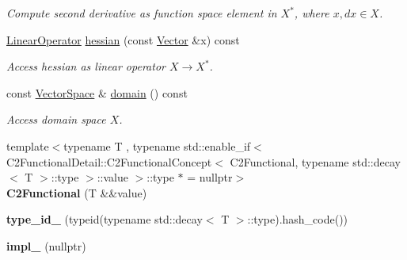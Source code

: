 \begin{DoxyCompactItemize}
\begin{DoxyCompactList}\small\item\em \-Compute second derivative as function space element in $X^*$, where $x,dx\in X$. \end{DoxyCompactList}\item 
\hypertarget{classSpacy_1_1C2Functional_a97eeeb376ed178ea7e2f109967f99c24}{\hyperlink{classSpacy_1_1LinearOperator}{\-Linear\-Operator} \hyperlink{classSpacy_1_1C2Functional_a97eeeb376ed178ea7e2f109967f99c24}{hessian} (const \hyperlink{classSpacy_1_1Vector}{\-Vector} \&x) const }\label{classSpacy_1_1C2Functional_a97eeeb376ed178ea7e2f109967f99c24}

\begin{DoxyCompactList}\small\item\em \-Access hessian as linear operator $ X \rightarrow X^* $. \end{DoxyCompactList}\item 
\hypertarget{classSpacy_1_1C2Functional_ac75246c876b8bf75cdd4f1264bdb49ae}{const \hyperlink{classSpacy_1_1VectorSpace}{\-Vector\-Space} \& \hyperlink{classSpacy_1_1C2Functional_ac75246c876b8bf75cdd4f1264bdb49ae}{domain} () const }\label{classSpacy_1_1C2Functional_ac75246c876b8bf75cdd4f1264bdb49ae}

\begin{DoxyCompactList}\small\item\em \-Access domain space $X$. \end{DoxyCompactList}\item 
\hypertarget{classSpacy_1_1C2Functional_ab6c458ef1a423c05f4996717f3772206}{{\footnotesize template$<$typename T , typename std\-::enable\-\_\-if$<$ C2\-Functional\-Detail\-::\-C2\-Functional\-Concept$<$ C2\-Functional, typename std\-::decay$<$ T $>$\-::type $>$\-::value $>$\-::type $\ast$  = nullptr$>$ }\\{\bfseries \-C2\-Functional} (\-T \&\&value)}\label{classSpacy_1_1C2Functional_ab6c458ef1a423c05f4996717f3772206}

\item 
\hypertarget{classSpacy_1_1C2Functional_a772ab63833bfd2a491daf9d36a0ab04f}{{\bfseries type\-\_\-id\-\_\-} (typeid(typename std\-::decay$<$ \-T $>$\-::type).hash\-\_\-code())}\label{classSpacy_1_1C2Functional_a772ab63833bfd2a491daf9d36a0ab04f}

\item 
\hypertarget{classSpacy_1_1C2Functional_a53ce875f31e18f3a8a7f4ea9b4fb35ed}{{\bfseries impl\-\_\-} (nullptr)}\label{classSpacy_1_1C2Functional_a53ce875f31e18f3a8a7f4ea9b4fb35ed}


\end{DoxyCompactItemize}
